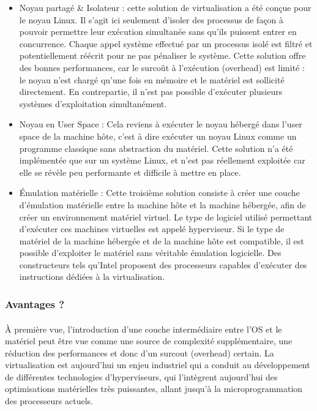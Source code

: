 \begin{itemize}
\item Noyau partagé \& Isolateur : cette solution de virtualisation a été conçue
pour le noyau Linux. Il s'agit ici seulement d'isoler des processus de façon à
pouvoir permettre leur exécution simultanée sans qu'ils puissent entrer en
concurrence. Chaque appel système effectué par un processus isolé est filtré et
potentiellement réécrit pour ne pas pénaliser le système. Cette solution offre
des bonnes performances, car le surcoût à l'exécution (overhead) est limité : le
noyau n'est chargé qu'une fois en mémoire et le matériel est sollicité
directement. En contrepartie, il n'est pas possible d'exécuter plusieurs
systèmes d'exploitation simultanément.
\item Noyau en User Space : Cela reviens à exécuter le noyau hébergé dans l'user
space de la machine hôte, c'est à dire exécuter un noyau Linux comme un
programme classique sans abstraction du matériel. Cette solution n'a été
implémentée que sur un système Linux, et n'est pas réellement exploitée car elle
se révèle peu performante et difficile à mettre en place.
\item Émulation matérielle : Cette troisième solution consiste à créer une
couche d'émulation matérielle entre la machine hôte et la machine hébergée, afin
de créer un environnement matériel virtuel. Le type de logiciel utilisé
permettant d'exécuter ces machines virtuelles est appelé hyperviseur. Si le type
de matériel de la machine hébergée et de la machine hôte est compatible, il est
possible d'exploiter le matériel sans véritable émulation logicielle. Des
constructeurs tels qu'Intel proposent des processeurs capables d'exécuter des
instructions dédiées à la virtualisation.
\end{itemize}

\subsubsection{Avantages ?}

\paragraph{} À première vue, l'introduction d'une couche intermédiaire entre
l'OS et le matériel peut être vue comme une source de complexité supplémentaire,
une réduction des performances et donc d'un surcout (overhead) certain.
La virtualisation est aujourd'hui un enjeu industriel qui a conduit au
développement de différentes technologies d'hyperviseurs, qui l'intègrent
aujourd'hui des optimisations matérielles très puissantes, allant jusqu'à la
microprogrammation des processeurs actuels.

